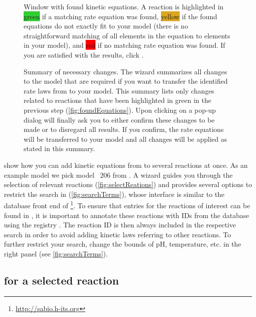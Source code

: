 \begin{figure}[b!]
\caption[Window with kinetic equations found for all reactions]{Window with found kinetic equations.
A reaction is highlighted in \colorbox{LimeGreen}{green} if a matching rate equation was found, \colorbox{Goldenrod}{yellow} if the found equations do not exactly fit to your model (there is no straightforward matching of all elements in the equation to elements in your model), and \colorbox{red}{red} if no matching rate equation was found.
If you are satisfied with the results, click .}
\label{fig:foundEquations}
\end{figure}
\begin{figure}[t!]
\caption[Summary of necessary changes]{Summary of necessary changes.
The wizard summarizes all changes to the model that are required if you want to transfer the identified rate laws from \SABIO to your model.
This summary lists only changes related to reactions that have been highlighted in green in the previous step (\vref{fig:foundEquations}).
Upon clicking on  a pop-up dialog will finally ask you to either confirm these changes to be made or to disregard all results.
If you confirm, the rate equations will be transferred to your model and all changes will be applied as stated in this summary.}
\label{fig:changes}
\end{figure}
 show how you can add kinetic equations from \SABIO to several reactions at once.
As an example model we pick model \numero~206 from \BioModels \citep{Li2010a, Wolf2000}.
A wizard guides you through the selection of relevant reactions (\vref{fig:selectReations}) and provides several options to restrict the search in \SABIO (\vref{fig:searchTerms}), whose interface is similar to the database front end of \SABIO\footnote{\url{http://sabio.h-its.org}}.
To ensure that entries for the reactions of interest can be found in \SABIO, it is important to annotate these reactions with \acp{ID} from the \KEGG database \citep{Kanehisa2000a} using the \MIRIAM registry \citep{Juty2012}.
The \KEGG reaction \ac{ID} is then always included in the respective search in order to avoid adding kinetic laws referring to other reactions.
To further restrict your search, change the bounds of pH, temperature, etc. in the right panel (see \vref{fig:searchTerms}).

\subsection{\SABIO for a selected reaction}

